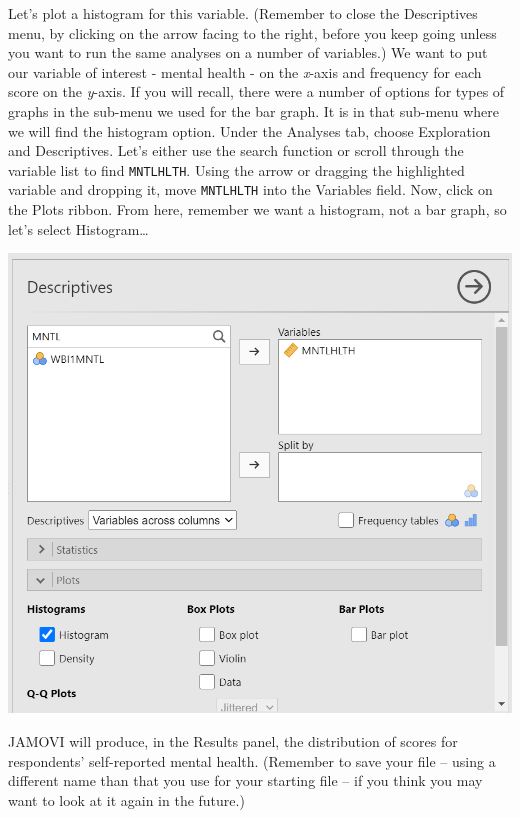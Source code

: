 \documentclass[
]{book}
\begin{document}
Let's plot a histogram for this variable. (Remember to close the Descriptives menu, by clicking on the arrow facing to the right, before you keep going unless you want to run the same analyses on a number of variables.) We want to put our variable of interest - mental health - on the \emph{x}-axis and frequency for each score on the \emph{y}-axis. If you will recall, there were a number of options for types of graphs in the sub-menu we used for the bar graph. It is in that sub-menu where we will find the histogram option.
Under the {Analyses} tab, choose {Exploration} and {Descriptives}. Let's either use the search function or scroll through the variable list to find \texttt{MNTLHLTH}. Using the arrow or dragging the highlighted variable and dropping it, move \texttt{MNTLHLTH} into the Variables field. Now, click on the {Plots} ribbon. From here, remember we want a histogram, not a bar graph, so let's select {Histogram}\ldots{}

\includegraphics{img/MNTLHLTHCommands.png}

JAMOVI will produce, in the Results panel, the distribution of scores for respondents' self-reported mental health. (Remember to save your file -- using a different name than that you use for your starting file -- if you think you may want to look at it again in the future.)
\end{document}
